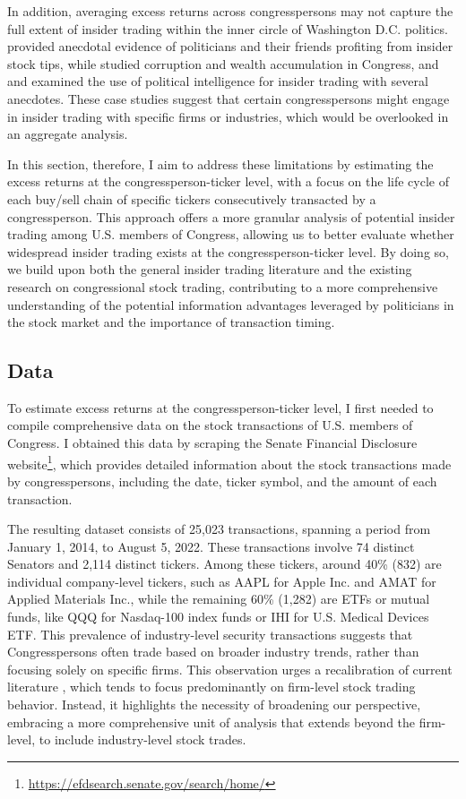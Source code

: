 \documentclass[15pt,letterpaper]{article}
\begin{document}
In addition, averaging excess returns across congresspersons may not capture the full extent of insider trading within the inner circle of Washington D.C. politics. \cite{schweizer2011} provided anecdotal evidence of politicians and their friends profiting from insider stock tips, 
while \cite{lim2009} studied corruption and wealth accumulation in Congress, and \cite{jerke2010} and \cite{bainbridge2010}
examined the use of political intelligence for insider trading with several anecdotes. 
These case studies suggest that certain congresspersons might engage in insider trading with specific firms or industries,
 which would be overlooked in an aggregate analysis.

In this section, therefore, I aim to address these limitations by estimating the excess returns at the congressperson-ticker level, with a focus on the life cycle of each buy/sell chain of specific tickers consecutively transacted by a congressperson. This approach offers a more granular analysis of potential insider trading among U.S. members of Congress, allowing us to better evaluate whether widespread insider trading exists at the congressperson-ticker level. By doing so, we build upon both the general insider trading literature and the existing research on congressional stock trading, contributing to a more comprehensive understanding of the potential information advantages leveraged by politicians in the stock market and the importance of transaction timing.

\subsection{Data}\label{sen-data}

To estimate excess returns at the congressperson-ticker level, I first needed to compile comprehensive data on the stock transactions of U.S. members of Congress. I obtained this data by scraping the Senate Financial Disclosure website\footnote{\url{https://efdsearch.senate.gov/search/home/}}, which provides detailed information about the stock transactions made by congresspersons, including the date, ticker symbol, and the amount of each transaction.

The resulting dataset consists of 25,023 transactions, spanning a period from January 1, 2014, to August 5, 2022. These transactions involve 74 distinct Senators and 2,114 distinct tickers. Among these tickers, around 40\% (832) are individual company-level tickers, such as AAPL for Apple Inc. and AMAT for Applied Materials Inc., while the remaining 60\% (1,282) are ETFs or mutual funds, like QQQ for Nasdaq-100 index funds or IHI for U.S. Medical Devices ETF.
This prevalence of industry-level security transactions suggests that Congresspersons often trade based on broader industry trends, rather than focusing solely on specific firms. This observation urges a recalibration of current literature \citep{zi11,zi24, eg13, eg14}, which tends to focus predominantly on firm-level stock trading behavior. Instead, it highlights the necessity of broadening our perspective, embracing a more comprehensive unit of analysis that extends beyond the firm-level, to include industry-level stock trades.
\end{document}
